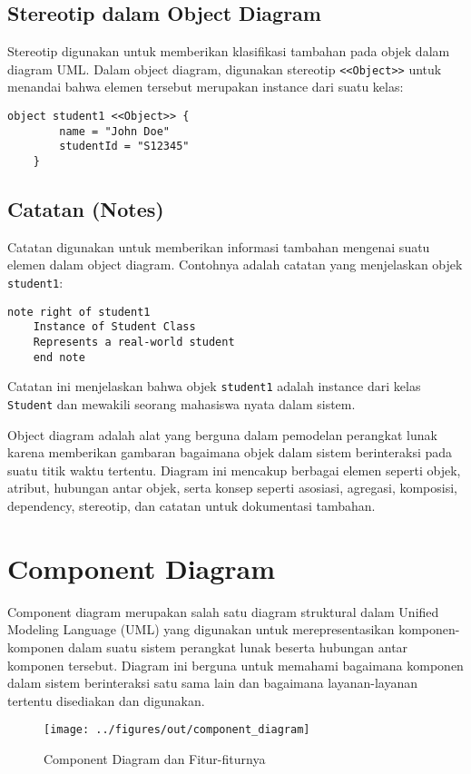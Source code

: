 \subsection{Stereotip dalam Object Diagram}
Stereotip digunakan untuk memberikan klasifikasi tambahan pada objek dalam diagram UML. Dalam object diagram, digunakan stereotip \texttt{<<Object>>} untuk menandai bahwa elemen tersebut merupakan instance dari suatu kelas:
\begin{lstlisting}[language=puml]
	object student1 <<Object>> {
		name = "John Doe"
		studentId = "S12345"
	}
\end{lstlisting}

\subsection{Catatan (Notes)}
Catatan digunakan untuk memberikan informasi tambahan mengenai suatu elemen dalam object diagram. Contohnya adalah catatan yang menjelaskan objek \texttt{student1}:
\begin{lstlisting}[language=puml]
	note right of student1
	Instance of Student Class
	Represents a real-world student
	end note
\end{lstlisting}
Catatan ini menjelaskan bahwa objek \texttt{student1} adalah instance dari kelas \texttt{Student} dan mewakili seorang mahasiswa nyata dalam sistem.

Object diagram adalah alat yang berguna dalam pemodelan perangkat lunak karena memberikan gambaran bagaimana objek dalam sistem berinteraksi pada suatu titik waktu tertentu. Diagram ini mencakup berbagai elemen seperti objek, atribut, hubungan antar objek, serta konsep seperti asosiasi, agregasi, komposisi, dependency, stereotip, dan catatan untuk dokumentasi tambahan.


\section{Component Diagram}

Component diagram merupakan salah satu diagram struktural dalam Unified Modeling Language (UML) yang digunakan untuk merepresentasikan komponen-komponen dalam suatu sistem perangkat lunak beserta hubungan antar komponen tersebut. Diagram ini berguna untuk memahami bagaimana komponen dalam sistem berinteraksi satu sama lain dan bagaimana layanan-layanan tertentu disediakan dan digunakan.

\begin{figure}[ht]
	\centering
	\texttt{[image: ../figures/out/component\_diagram]}
	\caption{Component Diagram dan Fitur-fiturnya}
	\label{fig:component_diagram}
\end{figure}

